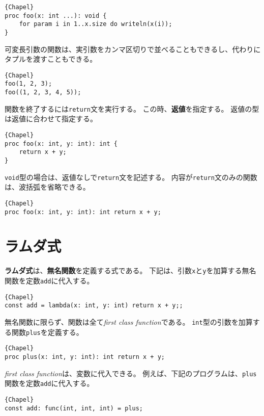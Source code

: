 \documentclass[10pt,a4paper]{book}
\begin{document}
\begin{Verbatim}{Chapel}
proc foo(x: int ...): void {
	for param i in 1..x.size do writeln(x(i));
}
\end{Verbatim}

可変長引数の関数は、実引数をカンマ区切りで並べることもできるし、代わりにタプルを渡すこともできる。

\begin{Verbatim}{Chapel}
foo(1, 2, 3);
foo((1, 2, 3, 4, 5));
\end{Verbatim}

関数を終了するには\verb#return#文を実行する。
この時、\textbf{返値}を指定する。
返値の型は返値に合わせて指定する。

\begin{Verbatim}{Chapel}
proc foo(x: int, y: int): int {
	return x + y;
}
\end{Verbatim}

\verb#void#型の場合は、返値なしで\verb#return#文を記述する。
内容が\verb#return#文のみの関数は、波括弧を省略できる。

\begin{Verbatim}{Chapel}
proc foo(x: int, y: int): int return x + y;
\end{Verbatim}

\section{ラムダ式\label{sec:lambda}}

\textbf{ラムダ式}は、\textbf{無名関数}を定義する式である。
下記は、引数\verb#x#と\verb#y#を加算する無名関数を定数\verb#add#に代入する。

\begin{Verbatim}{Chapel}
const add = lambda(x: int, y: int) return x + y;;
\end{Verbatim}

無名関数に限らず、関数は全て\textit{first class function}である。
\verb#int#型の引数を加算する関数\verb#plus#を定義する。

\begin{Verbatim}{Chapel}
proc plus(x: int, y: int): int return x + y;
\end{Verbatim}

\textit{first class function}は、変数に代入できる。
例えば、下記のプログラムは、\verb#plus#関数を定数\verb#add#に代入する。

\begin{Verbatim}{Chapel}
const add: func(int, int, int) = plus;
\end{Verbatim}
\end{document}
